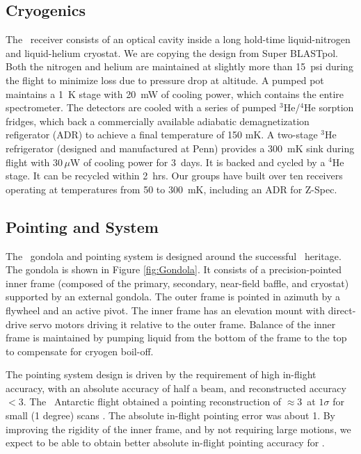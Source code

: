 \subsection{Cryogenics} 
 
The \name\ receiver consists of an optical cavity inside a long hold-time liquid-nitrogen and liquid-helium cryostat.  We are copying the design from Super BLASTpol.  Both the nitrogen and helium are maintained at slightly more than 15~psi during the flight to minimize loss due to pressure drop at altitude.  A pumped pot maintains a 1~K stage with 20~mW of cooling power, which contains the entire spectrometer.  The detectors are cooled with a series of pumped $^3$He/$^4$He sorption fridges, which back a commercially available adiabatic demagnetization refigerator (ADR) to achieve a final temperature of 150 mK.
A two-stage $^3$He refrigerator (designed and manufactured at Penn) provides a
300~mK sink during flight with $30\,\mu$W of cooling power for 3~days.  It is backed and cycled by a $^4$He stage.  It can be recycled within
2~hrs.  Our groups have built over ten
receivers operating at temperatures from 50 to 300~mK, including an ADR for Z-Spec.

\subsection{Pointing and System} 
\label{sec:Observing} 

The \name\ gondola and pointing system is designed around the
successful \blast\ heritage.  The gondola is shown in Figure
\ref{fig:Gondola}.  It consists of a precision-pointed inner frame
(composed of the primary, secondary, near-field baffle, and cryostat)
supported by an external gondola.  The outer frame is pointed in
azimuth by a flywheel and an active pivot. The inner frame has an
elevation mount with direct-drive servo motors driving it relative to
the outer frame.  Balance of the inner frame is maintained by pumping
liquid from the bottom of the frame to the top to compensate for
cryogen boil-off.

The pointing system design is driven by the requirement of high
in-flight accuracy, with an absolute accuracy of half a beam, and
reconstructed accuracy $<$3\arcsec.  The \blast\ Antarctic flight
obtained a pointing reconstruction of $\approx 3$\arcsec\ at $1\sigma$
for small (1 degree) scans .  The absolute in-flight
pointing error was about 1\arcmin.  By improving the rigidity of the
inner frame, and by not requiring large motions, we expect to be able
to obtain better absolute in-flight pointing accuracy for \name.

